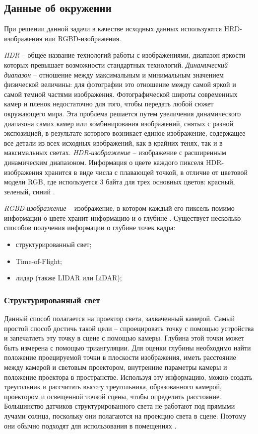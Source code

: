 \subsection{Данные об окружении}

При решении данной задачи в качестве исходных данных используются HRD-изображения или RGBD-изображения.

\textit{HDR} -- общее название технологий работы с изображениями, диапазон яркости которых превышает возможности стандартных технологий. \textit{Динамический диапазон} -- отношение между максимальным и минимальным значением физической величины: для фотографии это отношение между самой яркой и самой темной частями изображения. Фотографической широты современных камер и пленок недостаточно для того, чтобы передать любой сюжет окружающего мира. Эта проблема решается путем увеличения динамического диапазона самих камер или комбинирования изображений, снятых с разной экспозицией, в результате которого возникает единое изображение, содержащее все детали из всех исходных изображений, как в крайних тенях, так и в максимальных светах. \textit{HDR-изображение} -- изображение с расширенным динамическим диапазоном. Информация о цвете каждого пикселя HDR-изображения хранится в виде числа с плавающей точкой, в отличие от цветовой модели RGB, где используется 3 байта для трех основных цветов: красный, зеленый, синий \cite{hdri}.

\textit{RGBD-изображение} -- изображение, в котором каждый его пиксель помимо информации о цвете хранит информацию и о глубине \cite{rgbd}. Существует несколько способов получения информации о глубине точек кадра:

\begin{itemize}
	\item структурированный свет;
	\item Time-of-Flight;
	\item лидар (также LIDAR или LiDAR);
\end{itemize}

\subsubsection*{Структурированный свет}

Данный способ полагается на проектор света, захваченный камерой. Самый простой способ достичь такой цели -- спроецировать точку с помощью устройства и запечатлеть эту точку в сцене с помощью камеры. Глубина этой точки может быть измерена с помощью триангуляции. Для оценки глубины необходимо найти положение проецируемой точки в плоскости изображения, иметь расстояние между камерой и световым проектором, внутренние параметры камеры и положение проектора в пространстве. Используя эту информацию, можно создать треугольник и рассчитать высоту треугольника, образованного камерой, проектором и освещенной точкой сцены, чтобы определить расстояние. Большинство датчиков структурированного света не работают под прямыми лучами солнца, поскольку они полагаются на проекцию света в сцене. Поэтому они обычно подходят для использования в помещениях \cite{rgbd}.

